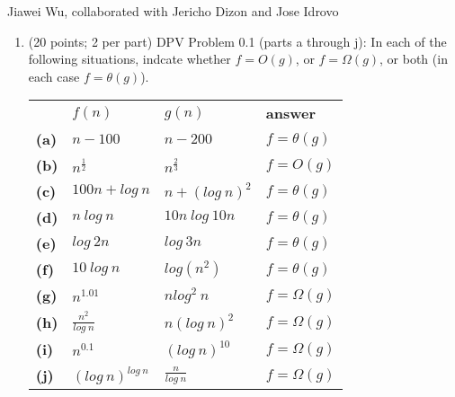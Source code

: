 \documentclass{article}
\begin{document}
    Jiawei Wu, collaborated with Jericho Dizon and Jose Idrovo
    \begin{enumerate}[label=\textbf{Q1}]
        \item (20 points; 2 per part) DPV Problem 0.1 (parts a through j): In each of the following situations, indcate whether $f = O(g)$, or $f = \Omega(g)$, or both (in each case $f = \theta(g)$).\\[0.25in]
        \begin{tabular}{l l l l}
            &$f(n)$ & $g(n)$ & \textbf{answer}\\
            \textbf{(a)} & $n - 100$ & $n - 200$ & $f = \theta(g)$\\
            \textbf{(b)} & $n^{\frac{1}{2}}$ & $n^{\frac{2}{3}}$ & $f = O(g)$\\
            \textbf{(c)} & $100n + log\ n$ & $n + (log\ n)^2$ & $f = \theta(g)$\\
            \textbf{(d)} & $n\ log\ n$ & $10n\ log\ 10n$ & $f = \theta(g)$\\
            \textbf{(e)} & $log\ 2n$ & $log\ 3n$ & $f = \theta(g)$\\
            \textbf{(f)} & $10\ log\ n$ & $log(n^2)$ & $f = \theta(g)$\\
            \textbf{(g)} & $n^{1.01}$ & $nlog^2\ n$ & $f = \Omega(g)$\\
            \textbf{(h)} & $\frac{n^2}{log\ n}$ & $n(log\ n)^2$ & $f = \Omega(g)$\\
            \textbf{(i)} & $n^{0.1}$ & $(log\ n)^{10}$ & $f = \Omega(g)$\\
            \textbf{(j)} & $(log\ n)^{log\ n}$ & $\frac{n}{log\ n}$ & $f = \Omega(g)$\\
        \end{tabular}
    \end{enumerate}
\end{document}

